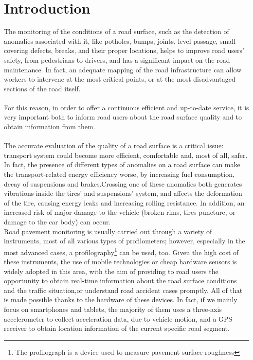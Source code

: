 \documentclass[tesi]{subfiles}
\begin{document}
\chapter{Introduction}
\label{ch:Introduction}

The monitoring of the conditions of a road surface, such as the detection of anomalies associated with it, like potholes, bumps, joints, level passage, small covering defects, breaks, and their proper locations, helps to improve road users' safety, from pedestrians to drivers, and has a significant impact on the road maintenance. In fact, an adequate mapping of the road infrastructure can allow workers to intervene at the most critical points, or at the most disadvantaged sections of the road itself.\\\\For this reason, in order to offer a continuous efficient and up-to-date service, it is very important both to inform road users about the road surface quality and to obtain information from them.\\\\
The accurate evaluation of the quality of a road surface is a critical issue: transport system could become more efficient, comfortable and, most of all, safer. In fact, the presence of different types of anomalies on a road surface can make the transport-related energy efficiency worse, by increasing fuel consumption, decay of suspensions and brakes.\clearpage \noindent Crossing one of these anomalies both generates vibrations inside the tires' and suspensions' system, and affects the deformation of the tire, causing energy leaks and increasing rolling resistance. In addition, an increased risk of major damage to the vehicle (broken rims, tires puncture, or damage to the car body) can occur.\\
Road pavement monitoring is usually carried out through a variety of instruments, most of all various types of profilometers; however, especially in the most advanced cases, a profilography\footnote{The profilograph is a device used to measure pavement surface roughness} can be used, too.
Given the high cost of these instruments, the use of mobile technologies or cheap hardware sensors is widely adopted in this area, with the aim of providing to road users the opportunity to obtain real-time information about the road surface conditions and the traffic situation,or understand road accident cases promptly. All of that is made possible thanks to the hardware of these devices. In fact, if we mainly focus on smartphones and tablets, the majority of them uses a three-axis accelerometer to collect acceleration data, due to vehicle motion, and a GPS receiver to obtain location information of the current specific road segment.\\
\end{document}

